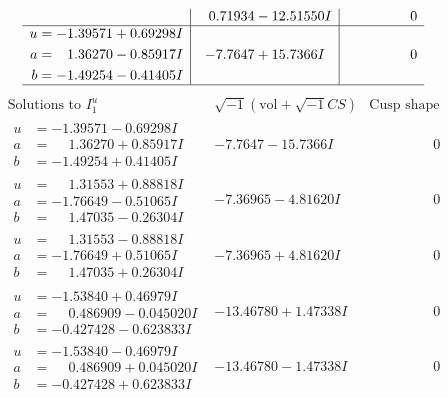 \documentclass[1p]{elsarticle_modified}
\theoremstyle{definition}
\newcommand{\I}{\sqrt{-1}}
\begin{document}
$$\begin{array}{c|c|c}
 & \phantom{-}0.71934 - 12.51550 I & \phantom{-0.000000 } 0 \\ \hline\begin{aligned}
u &= -1.39571 + 0.69298 I \\
a &= \phantom{-}1.36270 - 0.85917 I \\
b &= -1.49254 - 0.41405 I\end{aligned}
 & -7.7647 + 15.7366 I & \phantom{-0.000000 } 0\\
 \hline 
 \end{array}$$\newpage$$\begin{array}{c|c|c}  
\text{Solutions to }I^u_{1}& \I (\text{vol} + \sqrt{-1}CS) & \text{Cusp shape}\\
 \hline 
\begin{aligned}
u &= -1.39571 - 0.69298 I \\
a &= \phantom{-}1.36270 + 0.85917 I \\
b &= -1.49254 + 0.41405 I\end{aligned}
 & -7.7647 - 15.7366 I & \phantom{-0.000000 } 0 \\ \hline\begin{aligned}
u &= \phantom{-}1.31553 + 0.88818 I \\
a &= -1.76649 - 0.51065 I \\
b &= \phantom{-}1.47035 - 0.26304 I\end{aligned}
 & -7.36965 - 4.81620 I & \phantom{-0.000000 } 0 \\ \hline\begin{aligned}
u &= \phantom{-}1.31553 - 0.88818 I \\
a &= -1.76649 + 0.51065 I \\
b &= \phantom{-}1.47035 + 0.26304 I\end{aligned}
 & -7.36965 + 4.81620 I & \phantom{-0.000000 } 0 \\ \hline\begin{aligned}
u &= -1.53840 + 0.46979 I \\
a &= \phantom{-}0.486909 - 0.045020 I \\
b &= -0.427428 - 0.623833 I\end{aligned}
 & -13.46780 + 1.47338 I & \phantom{-0.000000 } 0 \\ \hline\begin{aligned}
u &= -1.53840 - 0.46979 I \\
a &= \phantom{-}0.486909 + 0.045020 I \\
b &= -0.427428 + 0.623833 I\end{aligned}
 & -13.46780 - 1.47338 I & \phantom{-0.000000 } 0 \\ \hline\begin{aligned}

\end{aligned}
\end{array}$$
\end{document}
